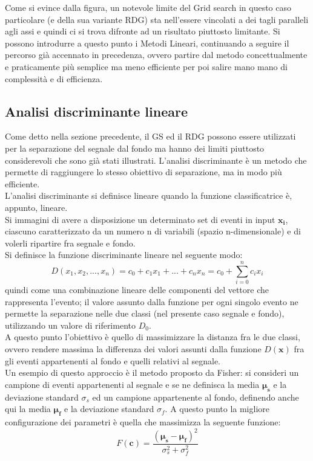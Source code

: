 Come si evince dalla figura, un notevole limite del Grid search in questo caso particolare (e della sua variante RDG) sta nell'essere vincolati a dei tagli paralleli agli assi e quindi ci si trova difronte ad un risultato piuttosto limitante. Si possono introdurre a questo punto i Metodi Lineari, continuando a seguire il percorso già accennato in precedenza, ovvero partire dal metodo concettualmente e praticamente più semplice ma meno efficiente per poi salire mano mano di complessità e di efficienza.\\

\newpage

\subsection{Analisi discriminante lineare}
\label{metodi lineari e discriminante di Fisher}

Come detto nella sezione precedente, il GS ed il RDG possono essere utilizzati per la separazione del segnale dal fondo ma hanno dei limiti piuttosto considerevoli che sono già stati illustrati. L'analisi discriminante è un metodo che permette di raggiungere lo stesso obiettivo di separazione, ma in modo più efficiente. \\
L'analisi discriminante si definisce lineare quando la funzione classificatrice è, appunto, lineare. \\
Si immagini di avere a disposizione un determinato set di eventi in input $\textbf{x}_\textbf{i}$, ciascuno caratterizzato da un numero n di variabili (spazio n-dimensionale) e di volerli ripartire fra segnale e fondo.\\
Si definisce la funzione discriminante lineare nel seguente modo:
\begin{equation}
D(x_1 , x_2 , ... , x_n) = c_0 + c_1x_1 + ... +c_nx_n = c_0 + \sum_{i=0}^{n} c_ix_i 
\end{equation}
quindi come una combinazione lineare delle componenti del vettore che rappresenta l'evento; il valore assunto dalla funzione per ogni singolo evento ne permette la separazione nelle due classi (nel presente caso segnale e fondo), utilizzando un valore di riferimento $D_0$. \\
A questo punto l'obiettivo è quello di massimizzare la distanza fra le due classi, ovvero rendere massima la differenza dei valori assunti dalla funzione $D(\textbf{x})$ fra gli eventi appartenenti al fondo e quelli relativi al segnale. \\
Un esempio di questo approccio è il metodo proposto da Fisher: si consideri un campione di eventi appartenenti al segnale e se ne definisca la media $\bm\mu_\textbf{s}$ e la deviazione standard $\sigma_s$ ed un campione appartenente al fondo, definendo anche qui la media $\bm\mu_\textbf{f}$ e la deviazione standard $\sigma_f$. A questo punto la migliore configurazione dei parametri è quella che massimizza la seguente funzione: 
\begin{equation}
F(\textbf{c}) = \frac{(\bm\mu_\textbf{s} - \bm\mu_\textbf{f})^2}{\sigma_s^2 + \sigma_f^2}
\end{equation} 
\newpage

